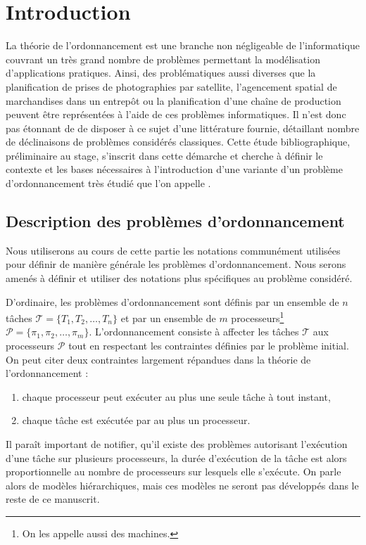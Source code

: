 \documentclass[a4paper,9pt]{report}
\begin{document}
\section{Introduction}

La théorie de l'ordonnancement est une branche non négligeable de l'informatique couvrant un très
grand nombre de problèmes permettant la modélisation d'applications pratiques. Ainsi, des
problématiques aussi diverses que la planification de prises de photographies par satellite,
l'agencement spatial de marchandises dans un entrepôt ou la planification d'une chaîne de production
peuvent être représentées à l'aide de ces problèmes informatiques. Il n'est donc pas étonnant de
de disposer à ce sujet d'une littérature fournie, détaillant nombre de déclinaisons de problèmes
considérés classiques. Cette étude bibliographique, préliminaire au stage, s'inscrit dans cette
démarche et cherche à définir le contexte et les bases nécessaires à l'introduction d'une variante
d'un problème d'ordonnancement très étudié que l'on appelle \isched.

\subsection{Description des problèmes d'ordonnancement}

Nous utiliserons au cours de cette partie les notations communément utilisées pour définir de
manière générale les problèmes d'ordonnancement. Nous serons amenés à définir et utiliser des
notations plus spécifiques au problème considéré.

D'ordinaire, les problèmes d'ordonnancement sont définis par un ensemble de $n$ tâches $\mathcal{T} =
\{T_1, T_2, \dots, T_n\}$ et par un ensemble de $m$ processeurs\footnote{On les appelle aussi des
machines.} $\mathcal{P} = \{\pi_1, \pi_2, \dots, \pi_m\}$. L'ordonnancement consiste à affecter les
tâches $\mathcal{T}$ aux processeurs $\mathcal{P}$ tout en respectant les contraintes définies par
le problème initial. On peut citer deux contraintes largement répandues dans la théorie de
l'ordonnancement :
\begin{enumerate}
    \item chaque processeur peut exécuter au plus une seule tâche à tout instant,
    \item chaque tâche est exécutée par au plus un processeur.
\end{enumerate}

Il paraît important de notifier, qu'il existe des problèmes autorisant l'exécution d'une tâche sur
plusieurs processeurs, la durée d'exécution de la tâche est alors proportionnelle au nombre de
processeurs sur lesquels elle s'exécute. On parle alors de modèles hiérarchiques, mais ces modèles
ne seront pas développés dans le reste de ce manuscrit.
\end{document}
